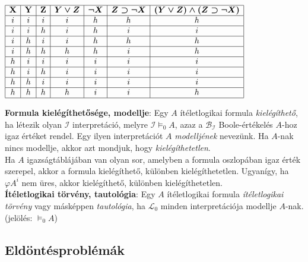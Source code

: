 \documentclass[tikz,12pt,margin=0px]{article}
\begin{document}
    \begin{center}
        $\begin{array}{|c|c|c|c|c|c|c|}
          \hline
          \textbf{X} & \textbf{Y} & \textbf{Z} & \boldsymbol{Y \vee Z} & \boldsymbol{\neg X} & \boldsymbol{Z \supset \neg X} & \boldsymbol{(Y \vee Z) \wedge (Z \supset \neg X)} \\ \hline
          i & i & i & i & h & h & h \\ \hline
          i & i & h & i & h & i & i \\ \hline
          i & h & i & i & h & h & h \\ \hline
          i & h & h & h & h & i & h \\ \hline
          h & i & i & i & i & i & i \\ \hline
          h & i & h & i & i & i & i \\ \hline
          h & h & i & i & i & i & i \\ \hline
          h & h & h & h & i & i & h \\ \hline

        \end{array}$
    \end{center}

    \noindent \textbf{Formula kielégíthetősége, modellje}: Egy $A$ ítéletlogikai formula \textit{kielégíthető}, ha létezik olyan  $\mathcal{I}$ interpretáció, melyre $\mathcal{I} \models_{0} A$, azaz a $\mathcal{B}_{\mathcal{I}}$ Boole-értékelés $A$-hoz igaz értéket rendel. Egy ilyen interpretációt $A$ \textit{modelljének} nevezünk. Ha $A$-nak nincs modellje, akkor azt mondjuk, hogy \textit{kielégíthetetlen}.\\
	
    \noindent Ha $A$ igazságtáblájában van olyan sor, amelyben a formula oszlopában igaz érték szerepel, akkor a formula kielégíthető, különben kielégíthetetlen. Ugyanígy, ha $\varphi A^{i}$ nem üres, akkor kielégíthető, különben kielégíthetetlen.\\
	
    \noindent \textbf{Ítéletlogikai törvény, tautológia}: Egy $A$ ítéletlogikai formula \textit{ítéletlogikai törvény} vagy másképpen \textit{tautológia}, ha $\mathcal{L}_{0}$ minden interpretációja modellje $A$-nak. (jelölés: $\models_{0} A$)\\

    \subsection*{Eldöntésproblémák\\}
\end{document}
